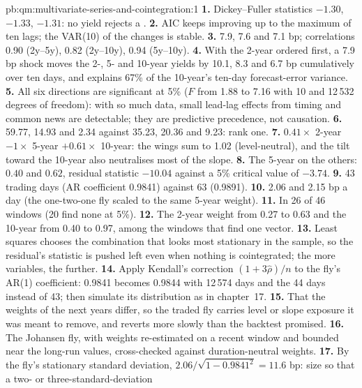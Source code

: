 \begin{solution}{pb:qm:multivariate-series-and-cointegration:1}
\textbf{1.} Dickey--Fuller statistics $-1.30$, $-1.33$, $-1.31$: no yield rejects a .
\textbf{2.} AIC keeps improving up to the maximum of ten lags; the VAR(10) of the changes is stable.
\textbf{3.} 7.9, 7.6 and 7.1 bp; correlations 0.90 (2y--5y), 0.82 (2y--10y), 0.94 (5y--10y).
\textbf{4.} With the 2-year ordered first, a 7.9 bp shock moves the 2-, 5- and 10-year yields by 10.1, 8.3 and 6.7 bp cumulatively over ten days, and explains 67\% of the
10-year's ten-day forecast-error variance.
\textbf{5.} All six directions are significant at 5\% ($F$ from 1.88 to 7.16 with 10 and 12\,532 degrees of freedom): with so much data, small lead-lag effects from
timing and common news are detectable; they are predictive precedence, not causation.
\textbf{6.} 59.77, 14.93 and 2.34 against 35.23, 20.36 and 9.23: rank one.
\textbf{7.} $0.41 \times$ 2-year $- 1 \times$ 5-year $+ 0.61 \times$ 10-year: the wings sum to 1.02 (level-neutral), and the tilt toward the 10-year also neutralises most of the
slope.
\textbf{8.} The 5-year on the others: $0.40$ and $0.62$, residual statistic $-10.04$ against a 5\% critical value of $-3.74$.
\textbf{9.} 43 trading days (AR coefficient 0.9841) against 63 (0.9891).
\textbf{10.} 2.06 and 2.15 bp a day (the one-two-one fly scaled to the same 5-year weight).
\textbf{11.} In 26 of 46 windows (20 find none at 5\%).
\textbf{12.} The 2-year weight from 0.27 to 0.63 and the 10-year from 0.40 to 0.97, among the windows that find one vector.
\textbf{13.} Least squares chooses the combination that looks most stationary in the sample, so the residual's statistic is pushed left even when nothing is
cointegrated; the more variables, the further.
\textbf{14.} Apply Kendall's correction $(1 + 3\hat\rho)/n$ to the fly's AR(1) coefficient: 0.9841 becomes 0.9844 with 12\,574 days and the  44 days
instead of 43; then simulate its distribution as in chapter~17.
\textbf{15.} That the weights of the next years differ, so the traded fly carries level or slope exposure it was meant to remove, and reverts more slowly than the
backtest promised.
\textbf{16.} The Johansen fly, with weights re-estimated on a recent window and bounded near the long-run values, cross-checked against duration-neutral weights.
\textbf{17.} By the fly's stationary standard deviation, $2.06/\sqrt{1 - 0.9841^2} = 11.6$ bp: size so that a two- or three-standard-deviation

\end{solution}
